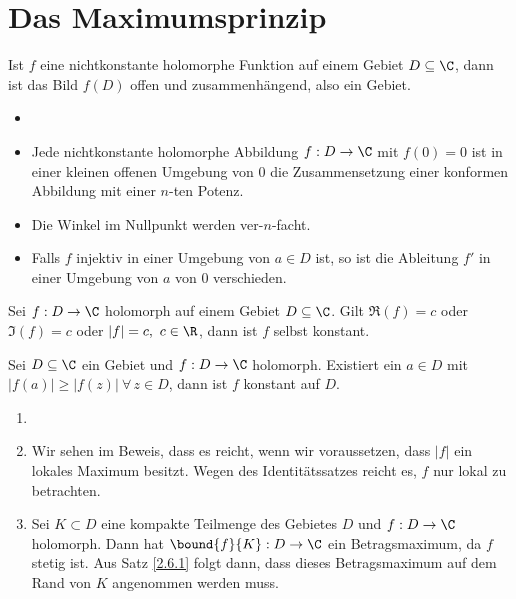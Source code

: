 \section{Das Maximumsprinzip}	\lecture
		
		\begin{thmn}\label{2.6.1}
			Ist $f$ eine nichtkonstante holomorphe Funktion auf einem Gebiet $D \subseteq \C$, dann ist das Bild $f(D)$ offen und zusammenhängend, also ein Gebiet.
		\end{thmn}
		
		\begin{prop}
			\begin{itemize}
				\item[]
				\item Jede nichtkonstante holomorphe Abbildung $f: D \to \C$ mit $f(0) = 0$ ist in einer kleinen offenen Umgebung von $0$ die Zusammensetzung einer konformen Abbildung mit einer $n$-ten Potenz.
				\item Die Winkel im Nullpunkt werden ver-$n$-facht.
				\item Falls $f$ injektiv in einer Umgebung von $a \in D$ ist, so ist die Ableitung $f'$ in einer Umgebung von $a$ von $0$ verschieden.
			\end{itemize}
		\end{prop}
		
		\begin{cor}
			Sei $ f: D \to \C $ holomorph auf einem Gebiet $D \subseteq \C$. Gilt $ \Re(f)=c $ oder $ \Im(f) = c $ oder $ |f|=c,\ c \in \R $, dann ist $f$ selbst konstant.
		\end{cor}
		
		\begin{thmn}
			Sei $ D \subseteq \C $ ein Gebiet und $ f: D \to \C $ holomorph. Existiert ein $a \in D$ mit $ |f(a)| \geq |f(z)| \ \forall\, z \in D $, dann ist $f$ konstant auf $D$.
		\end{thmn}
		
		\begin{rem*}
			\begin{enumerate}[label={\alph*})]
				\item[]
				\item Wir sehen im Beweis, dass es reicht, wenn wir voraussetzen, dass $|f|$ ein lokales Maximum besitzt. Wegen des Identitätssatzes reicht es, $f$ nur lokal zu betrachten.
				\item Sei $ K \subset D $ eine kompakte Teilmenge des Gebietes $D$ und $f : D \to \C$ holomorph. Dann hat $ \bound{f}{K}: D \to \C $ ein Betragsmaximum, da $f$ stetig ist. Aus Satz \ref{2.6.1} folgt dann, dass dieses Betragsmaximum auf dem Rand von $K$ angenommen werden muss.
			\end{enumerate}
		\end{rem*}
		
